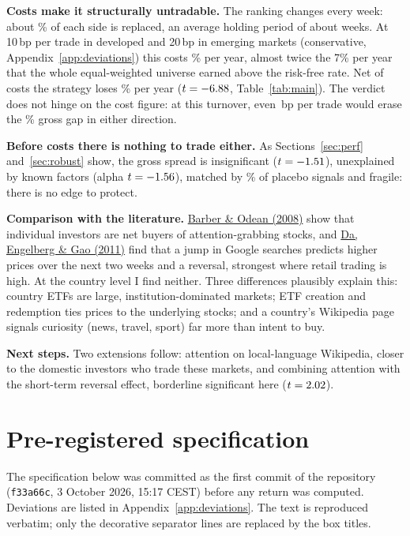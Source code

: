 \documentclass[11pt,a4paper]{article}
\DeclareRobustCommand{\refto}[2]{\hyperlink{ref:#1}{#2}}
\begin{document}
\textbf{Costs make it structurally untradable.} The ranking changes every week: about
\TurnoverPerSide\% of each side is replaced, an average holding period of about \HoldWeeks{} weeks. At 10\,bp per trade in developed and
20\,bp in emerging markets (conservative, Appendix~\ref{app:deviations}) this costs \CostAnn\% per year, almost
twice the 7\% per year that the whole equal-weighted universe earned above the risk-free rate. Net of costs the strategy loses \NetLoss\% per year
($t=-6.88$, Table~\ref{tab:main}). The verdict does not hinge on the cost figure: at this turnover,
even \BreakEvenBps\,bp per trade would erase the \LSLoss\% gross gap in either direction.

\textbf{Before costs there is nothing to trade either.} As Sections~\ref{sec:perf}
and~\ref{sec:robust} show, the gross spread is insignificant ($t=-1.51$), unexplained by known factors
(alpha $t=-1.56$), matched by \PlaceboPct\% of placebo signals and fragile: there is no edge to protect.

\textbf{Comparison with the literature.} \refto{barber2008}{Barber \& Odean (2008)} show that
individual investors are net buyers of attention-grabbing stocks, and
\refto{da2011}{Da, Engelberg \& Gao (2011)} find that a jump in Google searches predicts higher
prices over the next two weeks and a reversal, strongest where retail trading is high. At the country
level I find neither. Three differences plausibly explain this: country ETFs are large,
institution-dominated markets; ETF creation and redemption ties prices to the underlying stocks; and
a country's Wikipedia page signals curiosity (news, travel, sport) far more than intent to buy.

\textbf{Next steps.} Two extensions follow: attention on local-language Wikipedia, closer to the
domestic investors who trade these markets, and combining attention with the short-term reversal
effect, borderline significant here ($t=2.02$).


\clearpage
\appendix
\renewcommand{\thesection}{\Alph{section}}
\setcounter{figure}{0}
\setcounter{table}{0}

\section{Pre-registered specification}\label{app:spec}
The specification below was committed as the first commit of the
repository (\texttt{f33a66c}, 3 October 2026, 15:17 CEST) before any return was computed.
Deviations are listed in Appendix~\ref{app:deviations}. The text is reproduced verbatim; only the
decorative separator lines are replaced by the box titles.
\end{document}
